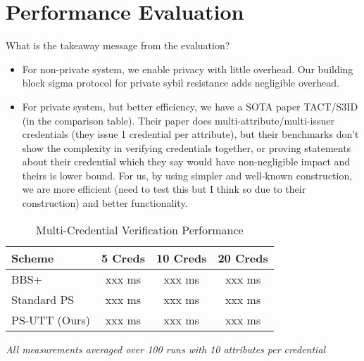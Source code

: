 \section{Performance Evaluation}\label{sec:evaluation}
What is the takeaway message from the evaluation?
\begin{itemize}
    \item For non-private system, we enable privacy with little overhead. Our building block sigma protocol for private sybil resistance adds negligible overhead. 
    \item For private system, but better efficiency, we have a SOTA paper TACT/S3ID (in the comparison table). Their paper does multi-attribute/multi-issuer credentials (they issue 1 credential per attribute), but their benchmarks don't show the complexity in verifying credentials together, or proving statements about their credential which they say would have non-negligible impact and theirs is lower bound. For us, by using simpler and well-known construction, we are more efficient (need to test this but I think so due to their construction) and better functionality. 
\end{itemize}






\begin{table}[t]
\centering
\caption{Multi-Credential Verification Performance}
\begin{tabular}{lccc}
\toprule
\textbf{Scheme} & \textbf{5 Creds} & \textbf{10 Creds} & \textbf{20 Creds} \\
\midrule
BBS+ \cite{CDL16}     & xxx ms & xxx ms & xxx ms \\
Standard PS \cite{PS16} & xxx ms & xxx ms & xxx ms \\
PS-UTT (Ours)          & xxx ms & xxx ms & xxx ms \\
\bottomrule
\end{tabular}
\vspace{1ex}
\begin{center}
\small\textit{All measurements averaged over 100 runs with 10 attributes per credential}
\end{center}
\end{table}

